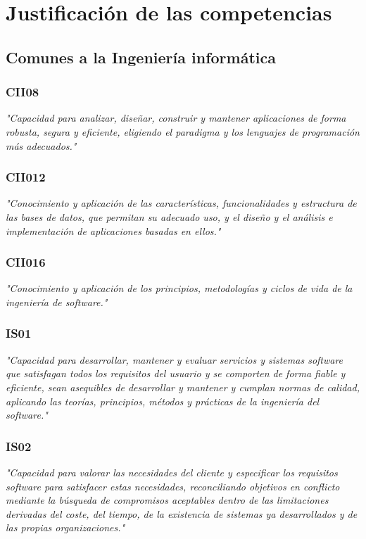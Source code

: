 \section{Justificación de las competencias}

\subsection{Comunes a la Ingeniería informática}
\subsubsection{CII08}
\textit{"Capacidad para analizar, diseñar, construir y mantener aplicaciones de forma
robusta, segura y eficiente, eligiendo el paradigma y los lenguajes de programación más
adecuados."}

\subsubsection{CII012}
\textit{"Conocimiento y aplicación de las características, funcionalidades y estructura de las
bases de datos, que permitan su adecuado uso, y el diseño y el análisis
e implementación de aplicaciones basadas en ellos."}

\subsubsection{CII016}
\textit{"Conocimiento y aplicación de los principios, metodologías y ciclos de vida de la
ingeniería de software."}

\subsubsection{IS01}
\textit{"Capacidad para desarrollar, mantener y evaluar servicios y sistemas software que
satisfagan todos los requisitos del usuario y se comporten de forma fiable y
eficiente, sean asequibles de desarrollar y mantener y cumplan normas de
calidad, aplicando las teorías, principios, métodos y prácticas de la ingeniería del
software."}

\subsubsection{IS02}
\textit{"Capacidad para valorar las necesidades del cliente y especificar los requisitos
software para satisfacer estas necesidades, reconciliando objetivos en
conflicto mediante la búsqueda de compromisos aceptables dentro de
las limitaciones derivadas del coste, del tiempo, de la existencia de sistemas ya
desarrollados y de las propias organizaciones."}

